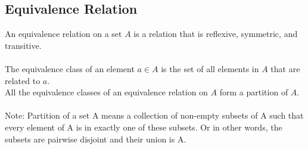 \documentclass[12pt,a4paper,oneside]{report}
\theoremstyle{definition}
\begin{document}
\subsection{Equivalence Relation}
An equivalence relation on a set $A$ is a relation that is reflexive, symmetric, and transitive. \\
\\The equivalence class of an element $a \in A$ is the set of all elements in $A$ that are related to $a$.
\\All the equivalence classes of an equivalence relation on $A$ form a partition of $A$.  
\\\\Note: Partition of a set A means a collection of non-empty subsets of A such that every element of A is in exactly one of these subsets. Or in other words, the subsets are pairwise disjoint and their union is A.
\end{document}
